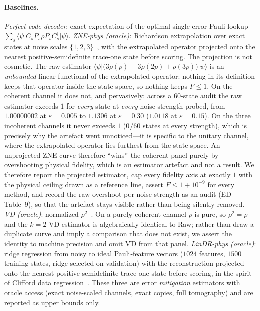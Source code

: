 \documentclass[aps,prxquantum,reprint,superscriptaddress]{revtex4-2}
\newcommand{\ket}[1]{\lvert #1\rangle}
\newcommand{\bra}[1]{\langle #1\rvert}
\begin{document}
\paragraph{Baselines.}
\emph{Perfect-code decoder}: exact expectation of the optimal single-error
Pauli lookup $\sum_s\bra{\psi}C_sP_s\rho P_sC_s^\dagger\ket{\psi}$.
\emph{ZNE-phys (oracle)}: Richardson extrapolation over exact states at noise
scales $\{1,2,3\}$~\cite{temme_zne,endo_zne}, with the extrapolated operator
projected onto the nearest positive-semidefinite trace-one state before scoring.
The projection is not cosmetic. The raw estimator
$\bra{\psi}\big(3\rho(p)-3\rho(2p)+\rho(3p)\big)\ket{\psi}$ is an
\emph{unbounded} linear functional of the extrapolated operator: nothing in its
definition keeps that operator inside the state space, so nothing keeps $F\le1$.
On the coherent channel it does not, and pervasively: across a $60$-state audit
the raw estimator exceeds $1$ for \emph{every} state at \emph{every} noise
strength probed, from $1.00000002$ at $\varepsilon=0.005$ to $1.1306$ at
$\varepsilon=0.30$ ($1.0118$ at $\varepsilon=0.15$). On the three incoherent
channels it never exceeds $1$ ($0/60$ states at every strength), which is
precisely why the artefact went unnoticed---it is specific to the unitary
channel, where the extrapolated operator lies furthest from the state space. An
unprojected ZNE curve therefore ``wins'' the coherent panel purely by overshooting
physical fidelity, which is an estimator artefact and not a result. We therefore
report the projected estimator, cap every fidelity axis at exactly $1$ with the
physical ceiling drawn as a reference line, assert $F\le1+10^{-9}$ for every
method, and record the raw overshoot per noise strength as an audit
(ED Table~9), so that the artefact stays visible rather than being silently
removed.
\emph{VD (oracle)}: normalized $\rho^2$~\cite{huggins_vd}. On a purely coherent
channel $\rho$ is pure, so $\rho^2=\rho$ and the $k{=}2$ VD estimator is
algebraically identical to Raw; rather than draw a duplicate curve and imply a
comparison that does not exist, we assert the identity to machine precision and
omit VD from that panel. \emph{LinDR-phys (oracle)}: ridge regression from
noisy to ideal Pauli-feature vectors ($1024$ features, $1500$ training states,
ridge selected on validation) with the reconstruction projected onto the
nearest positive-semidefinite trace-one state before scoring, in the spirit of
Clifford data regression~\cite{czarnik_cdr}. These three are error
\emph{mitigation} estimators with oracle access (exact noise-scaled channels,
exact copies, full tomography) and are reported as upper bounds only.
\end{document}
